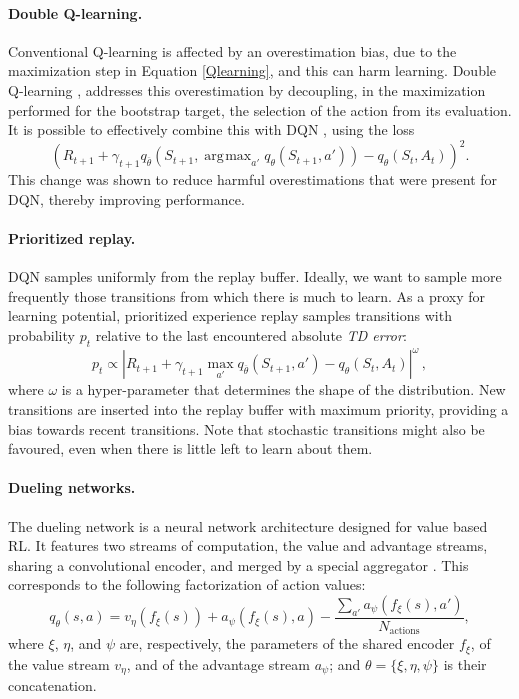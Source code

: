 \documentclass[letterpaper]{article} %
\DeclareMathOperator*{\argmax}{\arg\!\max}
\begin{document}
\paragraph{Double Q-learning.}
Conventional Q-learning is affected by an overestimation bias, due to the maximization step in Equation \ref{Qlearning}, and this can harm learning. Double Q-learning \cite{Hasselt2010double}, addresses this overestimation by decoupling, in the maximization performed for the bootstrap target, the selection of the action from its evaluation. It is possible to effectively combine this with DQN \cite{van2016deep}, using the loss
%
\[  %
(R_{t+1} + \gamma_{t+1} q_{\overline{\theta}}(S_{t+1}, \argmax_{a'}q_\theta(S_{t+1}, a')) - q_\theta(S_t, A_t))^2.
\]  %
%
This change was shown to reduce harmful overestimations that were present for DQN, thereby improving performance.

\paragraph{Prioritized replay.}
DQN samples uniformly from the replay buffer. Ideally, we want to sample more frequently those transitions from which there is much to learn. As a proxy for learning potential, prioritized experience replay \cite{schaul2015prioritized} samples transitions with probability $p_t$ relative to the last encountered absolute \textit{TD error}:
%
\[  %
p_t \propto  \left|R_{t+1} + \gamma_{t+1} \max_{a'} q_{\overline{\theta}}(S_{t+1}, a') - q_\theta(S_t, A_t)\right|^{\omega} \,,
\]  %
%
where $\omega$ is a hyper-parameter that determines the shape of the distribution.
New transitions are inserted into the replay buffer with maximum priority, providing a bias towards recent transitions. Note that stochastic transitions might also be favoured, even when there is little left to learn about them.

\paragraph{Dueling networks.}
The dueling network is a neural network architecture designed for value based RL. It features two streams of computation, the value and advantage streams, sharing a convolutional encoder, and merged by a special aggregator \cite{wang2016dueling}. This corresponds to the following factorization of action values:
%
\[  %
q_\theta(s,a) = v_{\eta}(f_\xi(s)) + a_{\psi}(f_\xi(s),a) - \frac{\sum_{a'}a_{\psi}(f_\xi(s),a')}{N_\text{actions}},
\]  %
%
where $\xi$, $\eta$, and $\psi$ are, respectively, the parameters of the shared encoder $f_\xi$, of the value stream $v_\eta$, and of the advantage stream $a_\psi$; and $\theta = \{\xi, \eta, \psi\}$ is their concatenation.
\end{document}
